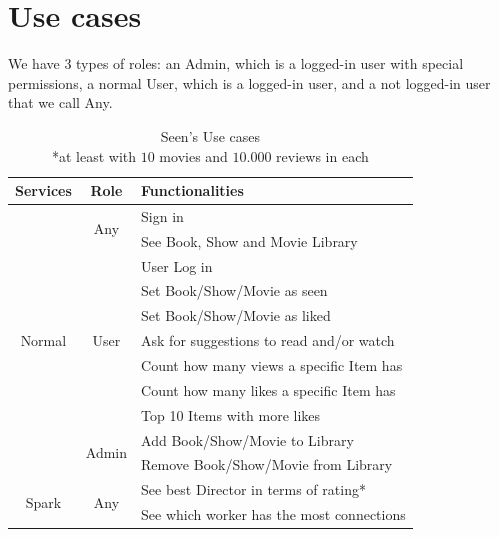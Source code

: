 \documentclass[oneside]{article}
\newcommand*\fpar{\hspace{1ex}}
\begin{document}
\section{Use cases}
\label{sec:cases}
\fpar We have 3 types of roles: an Admin, which is a logged-in user with special permissions, a normal User, which is a logged-in user, and a not logged-in user that we call Any.
\begin{table}[H]
  \centering
  \begin{tabular}{c|c|l} 
    Services & Role & Functionalities \\ \hline
    \multirow{11}{*}{ Normal }
      & \multirow{2}{*}{ Any } 
        & Sign in \\
      & & See Book, Show and Movie Library \\ \cline{2-3}
      & \multirow{7}{*}{ User } 
        & User Log in \\
      & & Set Book/Show/Movie as seen \\
      & & Set Book/Show/Movie as liked \\ 
      & & Ask for suggestions to read and/or watch \\ 
      & & Count how many views a specific Item has \\
      & & Count how many likes a specific Item has \\
      & & Top 10 Items with more likes \\ \cline{2-3}
    & \multirow{2}{*}{ Admin } 
        & Add Book/Show/Movie to Library \\
      & & Remove Book/Show/Movie from Library \\ \hline
    \multirow{2}{*}{ Spark }
      & \multirow{2}{*}{ Any }
        & See best Director in terms of rating* \\
      & & See which worker has the most connections \\
  \end{tabular}
  \caption{Seen's Use cases\\
          \**at least with $10$ movies and $10.000$ reviews in each}
\end{table}
\end{document}

